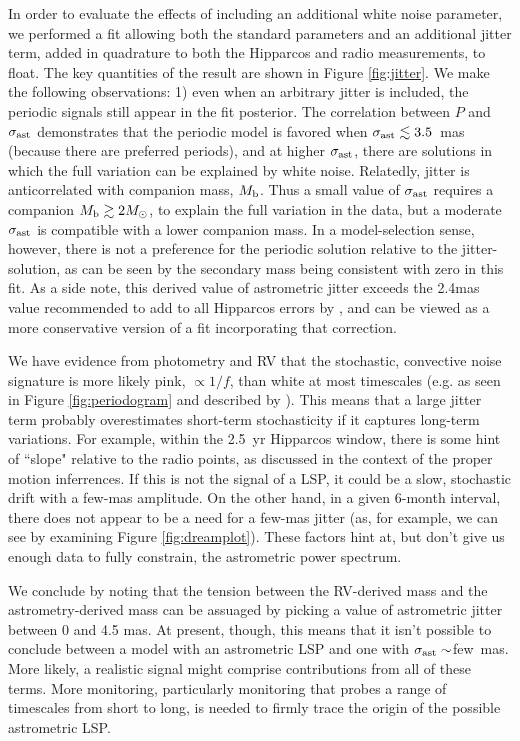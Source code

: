 \documentclass[twocolumn]{aastex631}
\begin{document}
In order to evaluate the effects of including an additional white noise parameter, we performed a fit allowing both the standard parameters and an additional jitter term, added in quadrature to both the Hipparcos and radio measurements, to float. The key quantities of the result are shown in Figure \ref{fig:jitter}. We make the following observations: 1) even when an arbitrary jitter is included, the periodic signals still appear in the fit posterior. The correlation between $P$ and $\sigma_{\rm ast}$ demonstrates that the periodic model is favored when $\sigma_{\rm ast}\lesssim 3.5$~mas (because there are preferred periods), and at higher $\sigma_{\rm ast}$, there are solutions in which the full variation can be explained by white noise. Relatedly, jitter is anticorrelated with companion mass, $M_{\rm b}$. Thus a small value of $\sigma_{\rm ast}$ requires a companion $M_{\rm b} \gtrsim 2 M_\odot$, to explain the full variation in the data, but a moderate $\sigma_{\rm ast}$ is compatible with a lower companion mass. In a model-selection sense, however, there is not a preference for the periodic solution relative to the jitter-solution, as can be seen by the secondary mass being consistent with zero in this fit. As a side note, this derived value of astrometric jitter exceeds the 2.4mas value recommended to add to all Hipparcos errors by \cite{Brandt:2023a}, and can be viewed as a more conservative version of a fit incorporating that correction.

We have evidence from photometry and RV that the stochastic, convective noise signature is more likely pink, $\propto 1/f$, than white at most timescales (e.g. as seen in Figure \ref{fig:periodogram} and described by \citet{2000A&AS..145..283K}). This means that a large jitter term probably overestimates short-term stochasticity if it captures long-term variations. For example, within the 2.5~yr Hipparcos window, there is some hint of ``slope" relative to the radio points, as discussed in the context of the proper motion inferrences. If this is not the signal of a LSP, it could be a slow, stochastic drift with a few-mas amplitude. On the other hand, in a given 6-month interval, there does not appear to be a need for a few-mas jitter (as, for example, we can see by examining Figure \ref{fig:dreamplot}). These factors hint at, but don't give us enough data to fully constrain, the astrometric power spectrum.  

We conclude by noting that the tension between the RV-derived mass and the astrometry-derived mass can be assuaged by picking a value of astrometric jitter between 0 and 4.5 mas. At present, though, this means that it isn't possible to conclude between a model with an astrometric LSP and one with $\sigma_{\rm ast}\sim$few~mas. More likely, a realistic signal might comprise contributions from all of these terms. More monitoring, particularly monitoring that probes a range of timescales from short to long, is needed to firmly trace the origin of the possible astrometric LSP. 
\end{document}
